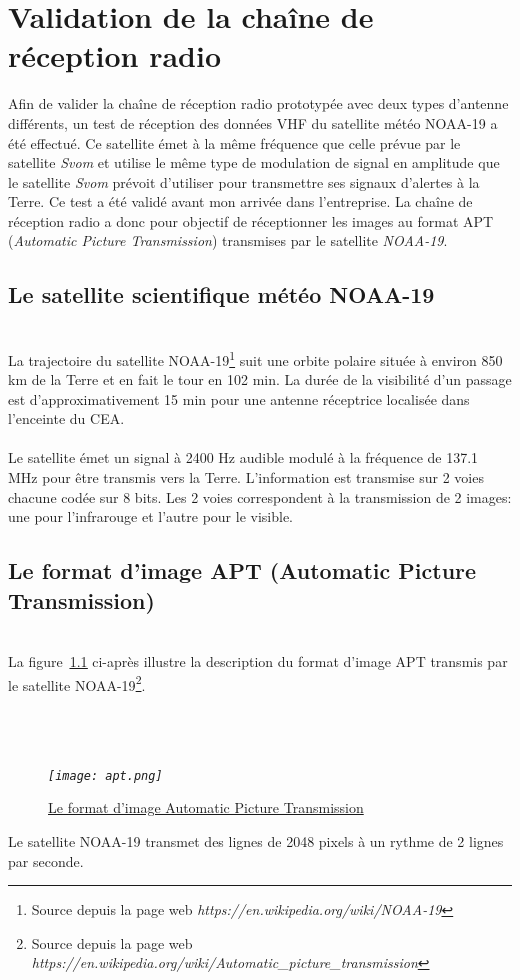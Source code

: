 \documentclass[12pt,fleqn]{book} %
\begin{document}
\chapter{Validation de la chaîne de réception radio}
Afin de valider la chaîne de réception radio prototypée avec deux types d'antenne différents, un test de réception des données VHF du satellite météo NOAA-19 a été effectué. Ce satellite émet à la même fréquence que celle prévue par le satellite \emph{Svom} et utilise le même type de modulation de signal en amplitude que le satellite \emph{Svom} prévoit d'utiliser pour transmettre ses signaux d'alertes à la Terre. Ce test a été validé avant mon arrivée dans l'entreprise.
La chaîne de réception radio a donc pour objectif de réceptionner les images au format APT (\emph{Automatic Picture Transmission}) transmises par le satellite \emph{NOAA-19}.
\section{Le satellite scientifique météo NOAA-19}
~\\\indent La trajectoire du satellite NOAA-19\footnote{Source depuis la page web \emph{https://en.wikipedia.org/wiki/NOAA-19}} suit une orbite polaire située à environ 850 km de la Terre et en fait le tour en 102 min. La durée de la visibilité d'un passage est d'approximativement 15 min pour une antenne réceptrice localisée dans l'enceinte du CEA.
~\\\\Le satellite émet un signal à 2400 Hz audible modulé à la fréquence de 137.1 MHz pour être transmis vers la Terre. L'information est transmise sur 2 voies chacune codée sur 8 bits. Les 2 voies correspondent à la transmission de 2 images: une pour l'infrarouge et l'autre pour le visible.
\section{Le format d'image APT (Automatic Picture Transmission)}
~\\\indent La figure~\underline{\color{blue}\ref{apt}} ci-après illustre la description du format d'image APT transmis par le satellite NOAA-19\footnote{Source depuis la page web \emph{https://en.wikipedia.org/wiki/Automatic\_picture\_transmission}}.
~\\\\
~\\\\
\begin{figure}[H]
	\centering
	\itshape
	\texttt{[image: apt.png]}
	\caption{\label{apt} \underline{Le format d'image Automatic Picture Transmission}}
\end{figure}
Le satellite NOAA-19 transmet des lignes de 2048 pixels à un rythme de 2 lignes par seconde.
\end{document}
